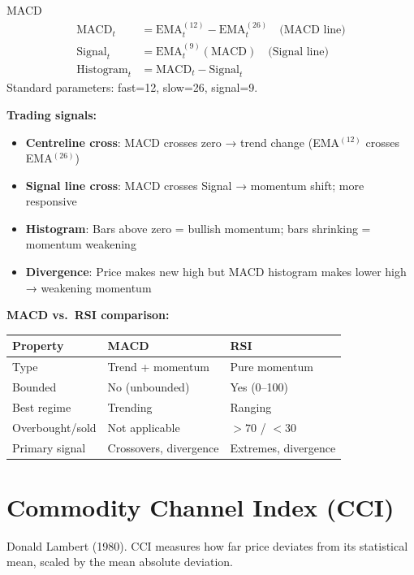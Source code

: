 \documentclass[12pt,a4paper,openany]{report}
\theoremstyle{definition}
\begin{document}
\begin{definitionbox}{MACD}
\begin{align}
  \text{MACD}_t &= \text{EMA}^{(12)}_t - \text{EMA}^{(26)}_t \quad \text{(MACD line)} \\
  \text{Signal}_t &= \text{EMA}^{(9)}_t(\text{MACD}) \quad \text{(Signal line)} \\
  \text{Histogram}_t &= \text{MACD}_t - \text{Signal}_t
\end{align}
Standard parameters: fast=12, slow=26, signal=9.
\end{definitionbox}

\textbf{Trading signals:}
\begin{itemize}
  \item \textbf{Centreline cross}: MACD crosses zero → trend change (EMA$^{(12)}$ crosses EMA$^{(26)}$)
  \item \textbf{Signal line cross}: MACD crosses Signal → momentum shift; more responsive
  \item \textbf{Histogram}: Bars above zero = bullish momentum; bars shrinking = momentum weakening
  \item \textbf{Divergence}: Price makes new high but MACD histogram makes lower high → weakening momentum
\end{itemize}

\textbf{MACD vs.\ RSI comparison:}
\begin{center}
\begin{tabular}{lll}
\toprule
\textbf{Property} & \textbf{MACD} & \textbf{RSI} \\
\midrule
Type & Trend + momentum & Pure momentum \\
Bounded & No (unbounded) & Yes (0--100) \\
Best regime & Trending & Ranging \\
Overbought/sold & Not applicable & $>70$ / $<30$ \\
Primary signal & Crossovers, divergence & Extremes, divergence \\
\bottomrule
\end{tabular}
\end{center}

\section{Commodity Channel Index (CCI)}

Donald Lambert (1980). CCI measures how far price deviates from its statistical mean, scaled by the mean absolute deviation.
\end{document}
